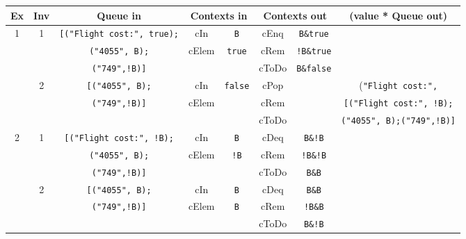 \begin{figure}[t]
  \centering
\setlength{\tabcolsep}{0.5em} %
{\renewcommand{\arraystretch}{1.2}%
\begin{center}
\footnotesize
\begin{tabular}[c]{ | c | c | c |  c  |  c  |  c | c | c | }
\hline

\hline


Ex  & Inv & Queue in & \multicolumn{2}{c|}{Contexts in} & \multicolumn{2}{c|}{Contexts out} & (value * Queue out) \\
\hline

\hline
 1 & 1 & \texttt{[("Flight cost:", true);} & cIn & \texttt{B}&  cEnq  & \texttt{B\&true}&   \\   
\cline{4-7} 
& &  \texttt{("4055", B);} & cElem & \texttt{true} &  cRem & \texttt{!B\&true} &   \\
\cline{4-7} 
& & \texttt{("749",!B)]} &  &  & cToDo & \texttt{B\&false}  &     \\
\cline{2-8} 
 & 2 & \texttt{[("4055", B);} & cIn & \texttt{false}&  cPop  &  & (\texttt{"Flight cost:",}  \\   
\cline{4-7} 
& & \texttt{("749",!B)]}& cElem &  &  cRem & &  \texttt{[("Flight cost:", !B);} \\
\cline{4-7} 
& & &  &  & cToDo &  &  \texttt{("4055", B);("749",!B)]}    \\
\hline

\hline
\hline

\hline


 2 & 1 & \texttt{[("Flight cost:", !B);} & cIn & \texttt{B}&  cDeq  & \texttt{B\&!B} &  \\   
\cline{4-7} 
& & \texttt{("4055", B);} & cElem & \texttt{!B} &  cRem &  \texttt{!B\&!B} &  \\
\cline{4-7} 
& & \texttt{("749",!B)]} &    &  & cToDo &\texttt{B\&B}  &      \\
\cline{2-8} 


 & 2 & \texttt{[("4055", B);} & cIn & \texttt{B}&  cDeq  & \texttt{B\&B}&  \\   
\cline{4-7} 
& & \texttt{("749",!B)]} & cElem & \texttt{B} &  cRem &\texttt{!B\&B}&  \\
\cline{4-7} 
& & &   &  & cToDo &\texttt{B\&!B} &      \\
\cline{2-8} 


\end{tabular}
\end{center}}
\end{figure}
